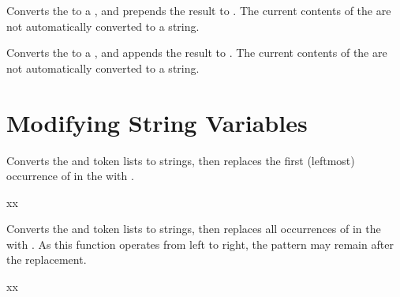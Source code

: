 \documentclass[oneside]{book}
\begin{document}
\begin{function}{\strPutLeft}
\begin{syntax}
  
\end{syntax}
Converts the  to a , and prepends the
result to .  The current contents of the  are not automatically converted to a string.
\begin{demohigh}
\strSet {}
\strPutLeft {}
\strUse \lTmpkStr
\end{demohigh}
\end{function}

\begin{function}{\strPutRight}
\begin{syntax}
  
\end{syntax}
Converts the  to a , and appends the
result to .  The current contents of the  are not automatically converted to a string.
\begin{demohigh}
\strSet {}
\strPutRight {}
\strUse \lTmpkStr
\end{demohigh}
\end{function}

\section{Modifying String Variables}

\begin{function}{\strVarReplaceOnce}
\begin{syntax}
   
\end{syntax}
Converts the  and  token lists to strings, then
replaces the first (leftmost) occurrence of  in the
 with .
\begin{demohigh}
\strSet {}
\strVarReplaceOnce {} {xx}
\strUse \lTmpaStr
\end{demohigh}
\end{function}

\begin{function}{\strVarReplaceAll}
\begin{syntax}
   
\end{syntax}
Converts the  and  token lists to strings, then
replaces all occurrences of  in the
 with .
As this function
operates from left to right, the pattern 
may remain after the replacement.
\begin{demohigh}
\strSet {}
\strVarReplaceAll {} {xx}
\strUse \lTmpaStr
\end{demohigh}
\end{function}
\end{document}
